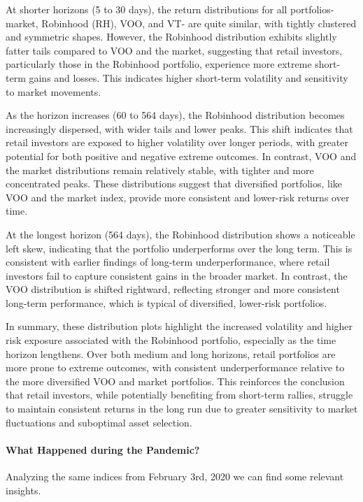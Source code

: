 At shorter horizons (5 to 30 days), the return distributions for all portfolios- market, Robinhood (RH), VOO, and VT- are quite similar, with tightly clustered and symmetric shapes. However, the Robinhood distribution exhibits slightly fatter tails compared to VOO and the market, suggesting that retail investors, particularly those in the Robinhood portfolio, experience more extreme short-term gains and losses. This indicates higher short-term volatility and sensitivity to market movements.

As the horizon increases (60 to 564 days), the Robinhood distribution becomes increasingly dispersed, with wider tails and lower peaks. This shift indicates that retail investors are exposed to higher volatility over longer periods, with greater potential for both positive and negative extreme outcomes. In contrast, VOO and the market distributions remain relatively stable, with tighter and more concentrated peaks. These distributions suggest that diversified portfolios, like VOO and the market index, provide more consistent and lower-risk returns over time.

At the longest horizon (564 days), the Robinhood distribution shows a noticeable left skew, indicating that the portfolio underperforms over the long term. This is consistent with earlier findings of long-term underperformance, where retail investors fail to capture consistent gains in the broader market. In contrast, the VOO distribution is shifted rightward, reflecting stronger and more consistent long-term performance, which is typical of diversified, lower-risk portfolios.

In summary, these distribution plots highlight the increased volatility and higher risk exposure associated with the Robinhood portfolio, especially as the time horizon lengthens. Over both medium and long horizons, retail portfolios are more prone to extreme outcomes, with consistent underperformance relative to the more diversified VOO and market portfolios. This reinforces the conclusion that retail investors, while potentially benefiting from short-term rallies, struggle to maintain consistent returns in the long run due to greater sensitivity to market fluctuations and suboptimal asset selection.
\paragraph{What Happened during the Pandemic?} Analyzing the same indices from February 3rd, 2020 we can find some relevant insights. 

